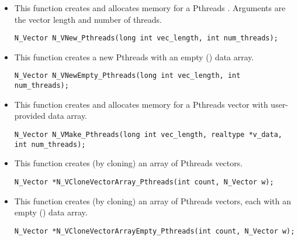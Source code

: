 \begin{itemize}


\item {}

  This function creates and allocates memory for a Pthreads .
  Arguments are the vector length and number of threads.

  

  \verb|N_Vector N_VNew_Pthreads(long int vec_length, int num_threads);|


\item {}

  This function creates a new Pthreads  with an empty () data array.

  

  \verb|N_Vector N_VNewEmpty_Pthreads(long int vec_length, int num_threads);|


\item {}

 This function creates and allocates memory for a Pthreads vector
 with user-provided data array.

 

 \verb|N_Vector N_VMake_Pthreads(long int vec_length, realtype *v_data, int num_threads);|


\item {}

 This function creates (by cloning) an array of  Pthreads vectors.

 

 \verb|N_Vector *N_VCloneVectorArray_Pthreads(int count, N_Vector w);|


\item {}

 This function creates (by cloning) an array of  Pthreads vectors, each with an
 empty () data array.

 

 \verb|N_Vector *N_VCloneVectorArrayEmpty_Pthreads(int count, N_Vector w);|


\end{itemize}
